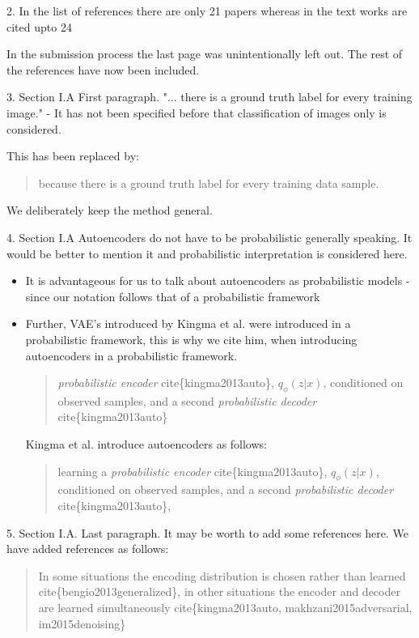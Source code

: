 \documentclass{article}
\begin{document}
{\color{blue}
2. In the list of references there are only 21 papers whereas in the text works are cited upto 24} \newline

In the submission process the last page was unintentionally left out. The rest of the references have now been included. \newline

{\color{blue}
3. Section I.A First paragraph. "... there is a ground truth label for every training image." - It has not been specified before that classification of images only is considered.} \newline

This has been replaced by:
\begin{quote}
    because there is a ground truth label for every training data sample.
\end{quote}
We deliberately keep the method general. \newline

{\color{blue}
4. Section I.A Autoencoders do not have to be probabilistic generally speaking. It would be better to mention it and probabilistic interpretation is considered here.}

\begin{itemize}
    \item It is advantageous for us to talk about autoencoders as probabilistic models - since our notation follows that of a probabilistic framework
    \item Further, VAE's introduced by Kingma et al. were introduced in a probabilistic framework, this is why we cite him, when introducing autoencoders in a probabilistic framework. 
    \begin{quote}
    \textit{probabilistic encoder} cite\{kingma2013auto\}, $q_\phi(z|x)$, conditioned on observed samples, and a second \textit{probabilistic decoder} cite\{kingma2013auto\}
    \end{quote}
    Kingma et al. introduce autoencoders as follows:
    \begin{quote}
        learning a \textit{probabilistic encoder} cite\{kingma2013auto\}, $q_\phi(z|x)$, conditioned on observed samples, and a second \textit{probabilistic decoder} cite\{kingma2013auto\},
    \end{quote} 
\end{itemize}

{\color{blue}
5. Section I.A. Last paragraph. It may be worth to add some references here.} \newline
We have added references as follows:
\begin{quote}
    In some situations the encoding distribution is chosen rather than learned cite\{bengio2013generalized\}, in other situations the encoder and decoder are learned simultaneously cite\{kingma2013auto, makhzani2015adversarial, im2015denoising\}
\end{quote}
\end{document}
